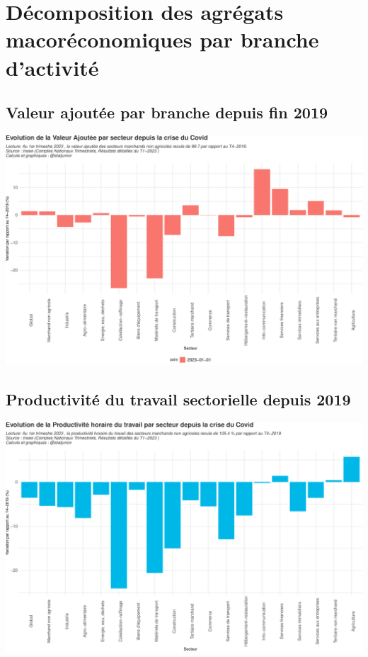 \documentclass[
  paper=a4,
  ,captions=tableheading
]{scrartcl}
\begin{document}
\newpage

\hypertarget{duxe9composition-des-agruxe9gats-macoruxe9conomiques-par-branche-dactivituxe9}{%
\section{Décomposition des agrégats macoréconomiques par branche
d'activité}\label{duxe9composition-des-agruxe9gats-macoruxe9conomiques-par-branche-dactivituxe9}}

\hypertarget{valeur-ajoutuxe9e-par-branche-depuis-fin-2019}{%
\subsection{Valeur ajoutée par branche depuis fin
2019}\label{valeur-ajoutuxe9e-par-branche-depuis-fin-2019}}

\includegraphics{rapport_pdf_compte_branche_files/figure-latex/unnamed-chunk-16-1.pdf}

\hypertarget{productivituxe9-du-travail-sectorielle-depuis-2019}{%
\subsection{Productivité du travail sectorielle depuis
2019}\label{productivituxe9-du-travail-sectorielle-depuis-2019}}

\includegraphics{rapport_pdf_compte_branche_files/figure-latex/unnamed-chunk-17-1.pdf}
\end{document}
